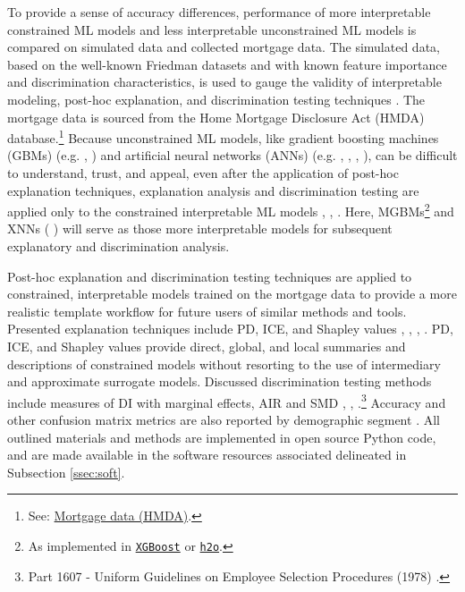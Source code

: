 \documentclass[information,article,submit,moreauthors,pdftex]{definitions/mdpi}
\begin{document}
To provide a sense of accuracy differences, performance of more interpretable constrained ML models and less interpretable unconstrained ML models is compared on simulated data and collected mortgage data. The simulated data, based on the well-known Friedman datasets and with known feature importance and discrimination characteristics, is used to gauge the validity of interpretable modeling, post-hoc explanation, and discrimination testing techniques \cite{friedman1991multivariate}. The mortgage data is sourced from the Home Mortgage Disclosure Act (HMDA) database.\footnote{See: \href{https://www.consumerfinance.gov/data-research/hmda/}{Mortgage data (HMDA)}.} Because unconstrained ML models, like gradient boosting machines (GBMs) (e.g. \cite{friedman2001greedy}, \cite{esl}) and artificial neural networks (ANNs) (e.g. \cite{recht2011hogwild}, \cite{hinton2012improving}, \cite{sutskever2013importance}, \cite{zeiler2012adadelta}), can be difficult to understand, trust, and appeal, even after the application of post-hoc explanation techniques, explanation analysis and discrimination testing are applied only to the constrained interpretable ML models \cite{please_stop}, \cite{fair_washing}, \cite{scaffolding}. Here, MGBMs\footnote{As implemented in \href{https://xgboost.readthedocs.io/en/latest/tutorials/monotonic.html}{\texttt{XGBoost}} or \href{https://github.com/h2oai/h2o-3/blob/master/h2o-py/demos/H2O_tutorial_gbm_monotonicity.ipynb}{\texttt{h2o}}.} and XNNs (\cite{wf_xnn} \cite{yang2019enhancing}) will serve as those more interpretable models for subsequent explanatory and discrimination analysis.

Post-hoc explanation and discrimination testing techniques are applied to constrained, interpretable models trained on the mortgage data to provide a more realistic template workflow for future users of similar methods and tools. Presented explanation techniques include PD, ICE, and Shapley values \cite{esl}, \cite{ice_plots}, \cite{shapley}, \cite{tree_shap}. PD, ICE, and Shapley values provide direct, global, and local summaries and descriptions of constrained models without resorting to the use of intermediary and approximate surrogate models. Discussed discrimination testing methods include measures of DI with marginal effects, AIR and SMD \cite{feldman2015certifying}, \cite{cohen2013statistical}, \cite{cohen1992power}.\footnote{Part 1607 - Uniform Guidelines on Employee Selection Procedures (1978) .} Accuracy and other confusion matrix metrics are also reported by demographic segment \cite{zafar2017fairness}. All outlined materials and methods are implemented in open source Python code, and are made available in the software resources associated delineated in Subsection \ref{ssec:soft}.  
\end{document}
